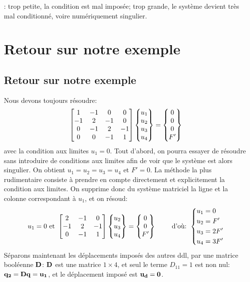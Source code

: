 \medskip
{}: trop petite, la condition est mal imposée; 
trop grande, le système devient très mal conditionné, voire numériquement singulier.

\medskip
\ifVersionAvecExemplesSepares
   \section{Retour sur notre exemple}
\else
   \subsection{Retour sur notre exemple}
\fi
Nous devons toujours résoudre:
\begin{equation}
\MM*{1 & -1 & 0 & 0 \\ -1 & 2 & -1 & 0 \\ 0 & -1 & 2 & -1\\ 0&0&-1&1}
\VV*{u_1\\u_2\\u_3\\u_4}
=
\VV*{0\\0\\0\\F'}
\end{equation}
avec la condition aux limites $u_1=0$.
\medskipvm
Tout d'abord, on pourra essayer de résoudre sans introduire de conditions aux limites afin de voir que le système est alors singulier. On obtient $u_1=u_2=u_3=u_4$ et $F'=0$.
\medskipvm
La méthode la plus rudimentaire consiste à prendre en compte directement et explicitement la condition aux limites.
On supprime donc du système matriciel la ligne et la colonne correspondant à $u_1$, et on résoud:
\begin{equation}\label{Eq-Base}
u_1=0 \text{ et }
\MM*{2 & -1 & 0 \\ -1 & 2 & -1\\ 0&-1&1}
\VV*{u_2\\u_3\\u_4}
=
\VV*{0\\0\\F'}
\qquad \text{ d'où: } 
\left\{\begin{aligned} &u_1=0 \\ &u_2=F' \\ &u_3=2F' \\ &u_4=3F' \end{aligned}\right.
\end{equation}
\medskipvm
Séparons maintenant les déplacements imposés des autres ddl, par une matrice booléenne $\MM{D}$:
$\MM{D}$ est une matrice $1\times 4$, et seul le terme $D_{11}=1$ est non nul: $\VV{q_2}=\MM{D}\VV{q}=\VV{u_1}$,
et le déplacement imposé est $\VV{u_d}=\VV{0}$.

